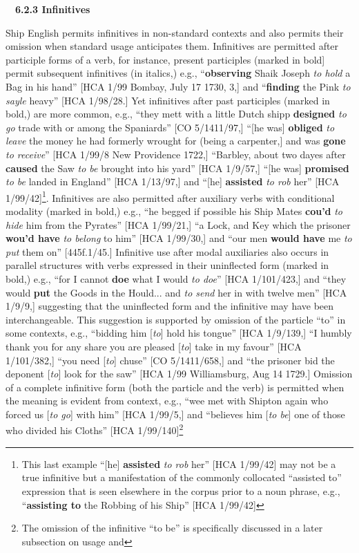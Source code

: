 \documentclass[12pt]{article}
\newenvironment{styleStandard}{\renewcommand\baselinestretch{1.0}\setlength\leftskip{0cm}\setlength\rightskip{0cm plus 1fil}\setlength\parindent{0cm}\setlength\parfillskip{0pt plus 1fil}\setlength\parskip{0in plus 1pt}\writerlistparindent\writerlistleftskip\leavevmode\normalfont\normalsize\writerlistlabel\ignorespaces}{\unskip\vspace{0in plus 1pt}\par}
\newcommand\writerlistleftskip{}
\newcommand\writerlistparindent{}
\newcommand\writerlistlabel{}
\begin{document}
\begin{styleStandard}
\ \ \textbf{6.2.3 Infinitives}
\end{styleStandard}


\begin{styleStandard}
Ship English permits infinitives in non-standard contexts and also permits their omission when standard usage anticipates them. Infinitives are permitted after participle forms of a verb, for instance, present participles (marked in bold] permit subsequent infinitives (in italics,) e.g., “\textbf{observing} Shaik Joseph \textit{to hold} a Bag in his hand” [HCA 1/99 Bombay, July 17 1730, 3,] and “\textbf{finding} the Pink \textit{to sayle} heavy” [HCA 1/98/28.] Yet infinitives after past participles (marked in bold,) are more common, e.g., “they mett with a little Dutch shipp \textbf{designed }\textit{to go} trade with or among the Spaniards” [CO 5/1411/97,] “[he was] \textbf{obliged} \textit{to leave} the money he had formerly wrought for (being a carpenter,] and was \textbf{gone }\textit{to receive}” [HCA 1/99/8 New Providence 1722,] “Barbley, about two dayes after \textbf{caused} the Saw \textit{to be} brought into his yard” [HCA 1/9/57,] “[he was] \textbf{promised} \textit{to be} landed in England” [HCA 1/13/97,] and “[he] \textbf{assisted} \textit{to rob} her” [HCA 1/99/42]\footnote{ This last example “[he] \textbf{assisted} \textit{to rob} her” [HCA 1/99/42] may not be a true infinitive but a manifestation of the commonly collocated “assisted to” expression that is seen elsewhere in the corpus prior to a noun phrase, e.g., “\textbf{assisting to} the Robbing of his Ship” [HCA 1/99/42]}. Infinitives are also permitted after auxiliary verbs with conditional modality (marked in bold,) e.g., “he begged if possible his Ship Mates \textbf{cou’d} \textit{to hide} him from the Pyrates” [HCA 1/99/21,] “a Lock, and Key which the prisoner \textbf{wou’d have} \textit{to belong} to him” [HCA 1/99/30,] and “our men \textbf{would have} me \textit{to put} them on” [445f.1/45.] Infinitive use after modal auxiliaries also occurs in parallel structures with verbs expressed in their uninflected form (marked in bold,) e.g., “for I cannot \textbf{doe }what I would \textit{to doe}” [HCA 1/101/423,] and “they would \textbf{put} the Goods in the Hould... and\textit{ to send }her in with twelve men” [HCA 1/9/9,] suggesting that the uninflected form and the infinitive may have been interchangeable. This suggestion is supported by omission of the particle “to” in some contexts, e.g., “bidding him [\textit{to}] hold his tongue” [HCA 1/9/139,] “I humbly thank you for any share you are pleased [\textit{to}] take in my favour” [HCA 1/101/382,] “you need [\textit{to}] chuse” [CO 5/1411/658,] and “the prisoner bid the deponent [\textit{to}] look for the saw” [HCA 1/99 Williamsburg, Aug 14 1729.] Omission of a complete infinitive form (both the particle and the verb) is permitted when the meaning is evident from context, e.g., “wee met with Shipton again who forced us [\textit{to go}] with him” [HCA 1/99/5,] and “believes him [\textit{to be}] one of those who divided his Cloths” [HCA 1/99/140]\footnote{ The omission of the infinitive “to be” is specifically discussed in a later subsection on usage and 
\end{styleStandard}
\end{document}
